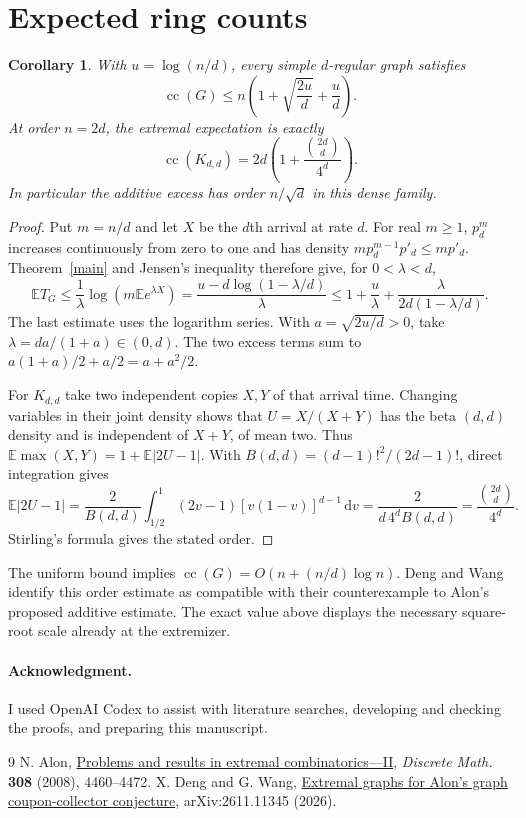 \documentclass[11pt,a4paper]{article}
\newtheorem{corollary}[theorem]{Corollary}
\theoremstyle{remark}
\newcommand{\E}{\mathbb E}
\newcommand{\dd}{\,\mathrm d}
\newcommand{\ack}{\paragraph*{Acknowledgment.} I used OpenAI Codex to assist with literature searches, developing and checking the proofs, and preparing this manuscript.}
\begin{document}
\section{Expected ring counts}
\begin{corollary}\label{dense}
With \(u=\log(n/d)\), every simple \(d\)-regular graph satisfies
\[
          \operatorname{cc}(G)\le
          n\left(1+\sqrt{\frac{2u}{d}}+\frac{u}{d}\right).
\]
At order \(n=2d\), the extremal expectation is exactly
\[
          \operatorname{cc}(K_{d,d})
          =2d\left(1+\frac{\binom{2d}{d}}{4^d}\right).
\]
In particular the additive excess has order \(n/\sqrt d\) in this dense family.
\end{corollary}
\newpage
\begin{proof}
Put \(m=n/d\) and let \(X\) be the \(d\)th arrival at rate \(d\). For real \(m\ge1\), \(p_d^m\) increases continuously from zero to one and has density \(m p_d^{m-1}p'_d\le m p'_d\). Theorem~\ref{main} and Jensen's inequality therefore give, for \(0<\lambda<d\),
\[
 \E T_G\le\frac{1}{\lambda}\log\!\left(m\E e^{\lambda X}\right)
 =\frac{u-d\log(1-\lambda/d)}{\lambda}
 \le 1+\frac{u}{\lambda}+\frac{\lambda}{2d(1-\lambda/d)} .
\]
The last estimate uses the logarithm series. With \(a=\sqrt{2u/d}>0\), take \(\lambda=da/(1+a)\in(0,d)\). The two excess terms sum to \(a(1+a)/2+a/2=a+a^2/2\).

For \(K_{d,d}\) take two independent copies \(X,Y\) of that arrival time. Changing variables in their joint density shows that \(U=X/(X+Y)\) has the beta \((d,d)\) density and is independent of \(X+Y\), of mean two. Thus \(\E\max(X,Y)=1+\E|2U-1|\). With \(B(d,d)=(d-1)!^2/(2d-1)!\), direct integration gives
\[
 \E|2U-1|
 =\frac{2}{B(d,d)}\int_{1/2}^1(2v-1)[v(1-v)]^{d-1}\dd v
 =\frac{2}{d\,4^d B(d,d)}=\frac{\binom{2d}{d}}{4^d}.
\]
Stirling's formula gives the stated order.
\end{proof}

The uniform bound implies \(\operatorname{cc}(G)=O(n+(n/d)\log n)\). Deng and Wang \cite[Sec.~5, Prop.~5.2]{DW} identify this order estimate as compatible with their counterexample to Alon's proposed additive estimate. The exact value above displays the necessary square-root scale already at the extremizer.

\ack
\begin{thebibliography}{9}
 N. Alon, \href{https://kam.mff.cuni.cz/~matousek/cla/alon-extremalII.pdf}{Problems and results in extremal combinatorics---II}, \emph{Discrete Math.} \textbf{308} (2008), 4460--4472.
 X. Deng and G. Wang, \href{https://arxiv.org/abs/2611.11345}{Extremal graphs for Alon's graph coupon-collector conjecture}, arXiv:2611.11345 (2026).
\end{thebibliography}
\end{document}
